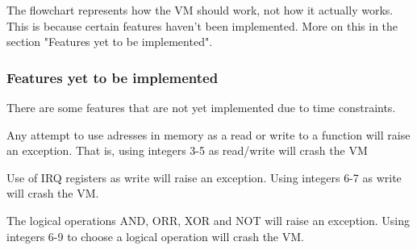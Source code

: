 The flowchart represents how the VM should work, not how it actually works. This is because certain features haven't been implemented. More on this in the section "Features yet to be implemented".



\subsubsection{Features yet to be implemented}
There are some features that are not yet implemented due to time constraints.

Any attempt to use adresses in memory as a read or write to a function will raise an exception. That is, using integers 3-5 as read/write will crash the VM

Use of IRQ registers as write will raise an exception. Using integers 6-7 as write will crash the VM.

The logical operations AND, ORR, XOR and NOT will raise an exception. Using integers 6-9 to choose a logical operation will crash the VM.
